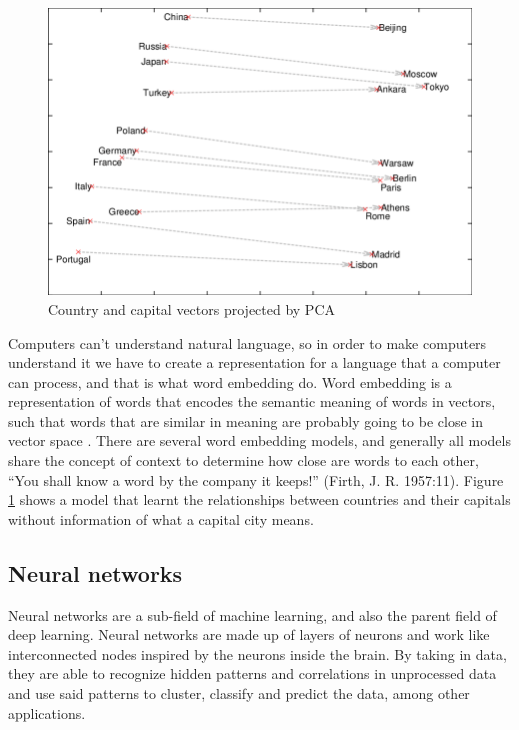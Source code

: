 \documentclass[12pt]{diazessay}
\newcounter{subsubsubsection}[subsubsection]
\begin{document}
            
            \begin{figure}[h]
                \centering
                \includegraphics[scale=0.42]{Figures/embeddings_fig.png}
                \caption{Country and capital vectors projected by PCA \cite{PCA_article}}
                \label{fig:wordembedding}
            \end{figure}
            
            Computers can’t understand natural language, so in order to make computers understand it we have to create a representation for a language that a computer can process, and that is what word embedding do. Word embedding is a representation of words that encodes the semantic meaning of words in vectors, such that words that are similar in meaning are probably going to be close in vector space \cite{jurafsky_martin_2000}. There are several word embedding models, and generally all models share the concept of context to determine how close are words to each other, “You shall know a word by the company it keeps!” (Firth, J. R. 1957:11). Figure \ref{fig:wordembedding} shows a model that learnt the relationships between countries and their capitals without information of what a capital city means.
    
        
    \subsection{Neural networks}
        Neural networks are a sub-field of machine learning, and also the parent field of deep learning. Neural networks are made up of layers of neurons and work like interconnected nodes inspired by the neurons inside the brain. By taking in data, they are able to recognize hidden patterns and correlations in unprocessed data and use said patterns to cluster, classify and predict the data, among other applications.
        
\end{document}
